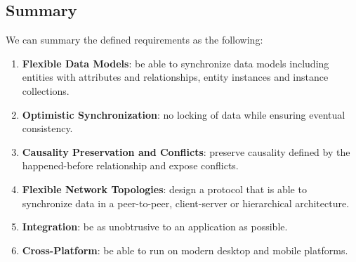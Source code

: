 \subsection{Summary}

We can summary the defined requirements as the following:

\begin{enumerate}
\item \textbf{Flexible Data Models}: be able to synchronize data models including entities with attributes and relationships, entity instances and instance collections.
\item \textbf{Optimistic Synchronization}: no locking of data while ensuring eventual consistency.
\item \textbf{Causality Preservation and Conflicts}: preserve causality defined by the happened-before relationship and expose conflicts.
\item \textbf{Flexible Network Topologies}: design a protocol that is able to synchronize data in a peer-to-peer, client-server or hierarchical architecture.
\item \textbf{Integration}: be as unobtrusive to an application as possible.
\item \textbf{Cross-Platform}: be able to run on modern desktop and mobile platforms.
\end{enumerate}

